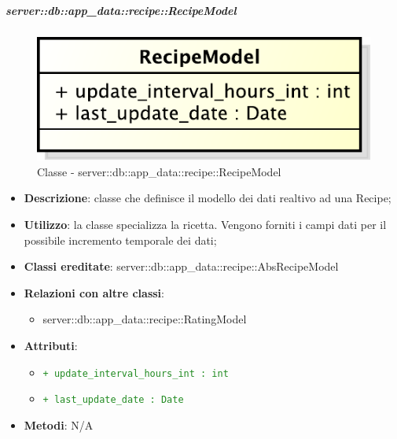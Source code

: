		\subparagraph{server::db::app\_data::recipe::RecipeModel} %
		\label{subp:server_db_app_data_recipe_recipemodel}
			\begin{figure}[htbp]
				\centering
				\centerline{\includegraphics[scale=0.75]{./images/server/classes/db/recipe_model.pdf}}
				\caption{Classe - server::db::app\_data::recipe::RecipeModel}
			\end{figure}
			\begin{itemize}
				\item \textbf{Descrizione}: classe che definisce il modello dei dati realtivo ad una Recipe;
				\item \textbf{Utilizzo}: la classe specializza la ricetta. Vengono forniti i campi dati per il possibile incremento temporale dei dati;
				\item \textbf{Classi ereditate}: server::db::app\_data::recipe::AbsRecipeModel
				\item \textbf{Relazioni con altre classi}:
					\begin{itemize}
						\item server::db::app\_data::recipe::RatingModel
					\end{itemize}
				\item \textbf{Attributi}:
					\begin{itemize}
						\item \textcolor{forestgreen}{\texttt{+ update\_interval\_hours\_int : int}}
						\item \textcolor{forestgreen}{\texttt{+ last\_update\_date : Date}}
					\end{itemize}
				\item \textbf{Metodi}: N/A
			\end{itemize}

